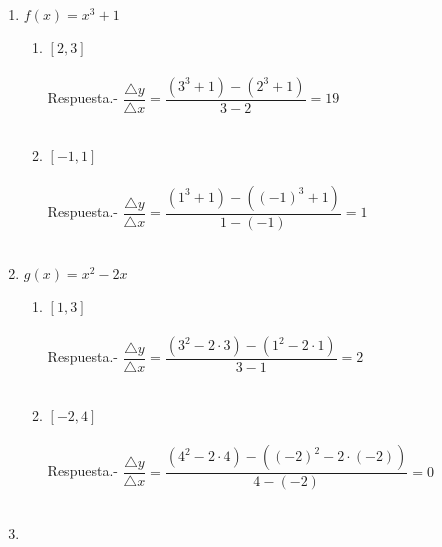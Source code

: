 \begin{enumerate}

\item $f(x) = x^3 + 1$ 
\begin{enumerate}[\bfseries a)]
    
    \item $[2,3]$\\\\
	Respuesta.-\; $\dfrac{\triangle y}{\triangle x} = \dfrac{(3^3 + 1) - (2^3 + 1)}{3 - 2} = 19$\\\\

    \item $[-1,1]$\\\\
	Respuesta.-\; $\dfrac{\triangle y}{\triangle x} = \dfrac{(1^3 + 1)-((-1)^3 + 1)}{1-(-1)} = 1$\\\\

\end{enumerate}

\item $g(x) = x^2 - 2x$
\begin{enumerate}[\bfseries a)]
    
    \item $[1,3]$\\\\
	Respuesta.-\; $\dfrac{\triangle y}{\triangle x} = \dfrac{(3^2 - 2\cdot 3) - (1^2 - 2\cdot 1)}{3-1} = 2 $\\\\ 
    
    \item $[-2,4]$\\\\
	Respuesta.-\; $\dfrac{\triangle y}{\triangle x} = \dfrac{(4^2 - 2\cdot 4) - ((-2)^2 - 2\cdot (-2))}{4-(-2)} = 0$\\\\

\end{enumerate}

\item 

\end{enumerate}
